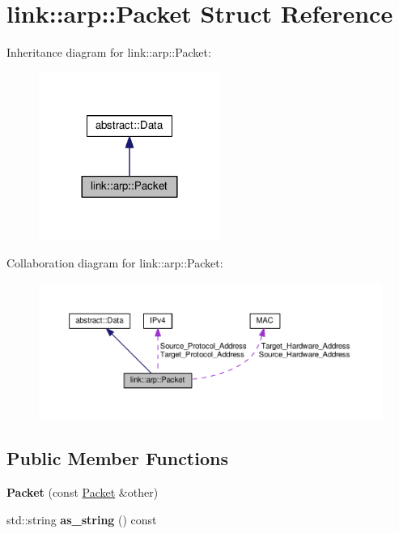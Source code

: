\hypertarget{structlink_1_1arp_1_1Packet}{}\section{link\+:\+:arp\+:\+:Packet Struct Reference}
\label{structlink_1_1arp_1_1Packet}


Inheritance diagram for link\+:\+:arp\+:\+:Packet\+:\nopagebreak
\begin{figure}[H]
\begin{center}
\leavevmode
\includegraphics[width=168pt]{structlink_1_1arp_1_1Packet__inherit__graph}
\end{center}
\end{figure}


Collaboration diagram for link\+:\+:arp\+:\+:Packet\+:
\nopagebreak
\begin{figure}[H]
\begin{center}
\leavevmode
\includegraphics[width=350pt]{structlink_1_1arp_1_1Packet__coll__graph}
\end{center}
\end{figure}
\subsection*{Public Member Functions}
\begin{DoxyCompactItemize}
\item 
{\bfseries Packet} (const \hyperlink{structlink_1_1arp_1_1Packet}{Packet} \&other)\hypertarget{structlink_1_1arp_1_1Packet_a96f29d607c34ae169c28e5d01b111905}{}\label{structlink_1_1arp_1_1Packet_a96f29d607c34ae169c28e5d01b111905}

\item 
std\+::string {\bfseries as\+\_\+string} () const \hypertarget{structlink_1_1arp_1_1Packet_a52f7b2c60b11900664c7be8965d7846b}{}\label{structlink_1_1arp_1_1Packet_a52f7b2c60b11900664c7be8965d7846b}

\end{DoxyCompactItemize}
